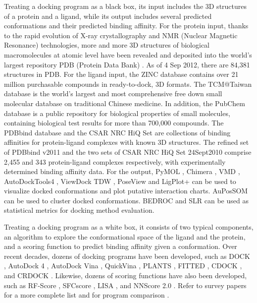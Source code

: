 Treating a docking program as a black box, its input includes the 3D structures of a protein and a ligand, while its output includes several predicted conformations and their predicted binding affinity. For the protein input, thanks to the rapid evolution of X-ray crystallography and NMR (Nuclear Magnetic Resonance) technologies, more and more 3D structures of biological macromolecules at atomic level have been revealed and deposited into the world's largest repository PDB (Protein Data Bank) \citep{540,537}. As of 4 Sep 2012, there are 84,381 structures in PDB. For the ligand input, the ZINC database \citep{532,1178} contains over 21 million purchasable compounds in ready-to-dock, 3D formats. The TCM@Taiwan database \citep{528} is the world's largest and most comprehensive free down small molecular database on traditional Chinese medicine. In addition, the PubChem database \citep{526} is a public repository for biological properties of small molecules, containing biological test results for more than 700,000 compounds. The PDBbind database \citep{529,530} and the CSAR NRC HiQ Set \citep{857,960} are collections of binding affinities for protein-ligand complexes with known 3D structures. The refined set of PDBbind v2011 and the two sets of CSAR NRC HiQ Set 24Sept2010 comprise 2,455 and 343 protein-ligand complexes respectively, with experimentally determined binding affinity data. For the output, PyMOL \citep{1221}, Chimera \citep{1219}, VMD \citep{1220}, AutoDockTools4 \citep{596}, ViewDock TDW \citep{559}, PoseView \citep{748} and LigPlot+ \citep{951} can be used to visualize docked conformations and plot putative interaction charts. AuPosSOM \citep{598} can be used to cluster docked conformations. BEDROC \citep{490} and SLR \citep{489} can be used as statistical metrics for docking method evaluation.

Treating a docking program as a white box, it consists of two typical components, an algorithm to explore the conformational space of the ligand and the protein, and a scoring function to predict binding affinity given a conformation. Over recent decades, dozens of docking programs have been developed, such as DOCK \citep{1222}, AutoDock 4 \citep{785,596}, AutoDock Vina \citep{595}, QuickVina \citep{1193}, PLANTS \citep{610,607,779}, FITTED \citep{602}, CDOCK \citep{1224}, and CRDOCK \citep{1200}. Likewise, dozens of scoring functions have also been developed, such as RF-Score \citep{564}, SFCscore \citep{581}, LISA \citep{775}, and NNScore 2.0 \citep{977}. Refer to survey papers for a more complete list \citep{493,922} and for program comparison \citep{556,637}.


